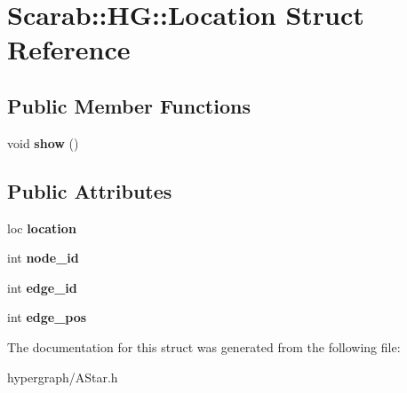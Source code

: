 \hypertarget{struct_scarab_1_1_h_g_1_1_location}{
\section{Scarab::HG::Location Struct Reference}
\label{struct_scarab_1_1_h_g_1_1_location}
}
\subsection*{Public Member Functions}
\begin{DoxyCompactItemize}
\item 
\hypertarget{struct_scarab_1_1_h_g_1_1_location_a66e686eed3a0038886fd24171ec0ae8e}{
void {\bfseries show} ()}
\label{struct_scarab_1_1_h_g_1_1_location_a66e686eed3a0038886fd24171ec0ae8e}

\end{DoxyCompactItemize}
\subsection*{Public Attributes}
\begin{DoxyCompactItemize}
\item 
\hypertarget{struct_scarab_1_1_h_g_1_1_location_a493249f5c4c2ad6870d1cf1f9dd3f5f5}{
loc {\bfseries location}}
\label{struct_scarab_1_1_h_g_1_1_location_a493249f5c4c2ad6870d1cf1f9dd3f5f5}

\item 
\hypertarget{struct_scarab_1_1_h_g_1_1_location_a9a11d2d02ffd88048526a28c7619a3c7}{
int {\bfseries node\_\-id}}
\label{struct_scarab_1_1_h_g_1_1_location_a9a11d2d02ffd88048526a28c7619a3c7}

\item 
\hypertarget{struct_scarab_1_1_h_g_1_1_location_a618dd1682636ccc635ced4dc536be305}{
int {\bfseries edge\_\-id}}
\label{struct_scarab_1_1_h_g_1_1_location_a618dd1682636ccc635ced4dc536be305}

\item 
\hypertarget{struct_scarab_1_1_h_g_1_1_location_a9e3f8708a3b6c0271a7a854bc6dbde79}{
int {\bfseries edge\_\-pos}}
\label{struct_scarab_1_1_h_g_1_1_location_a9e3f8708a3b6c0271a7a854bc6dbde79}

\end{DoxyCompactItemize}


The documentation for this struct was generated from the following file:\begin{DoxyCompactItemize}
\item 
hypergraph/AStar.h\end{DoxyCompactItemize}
